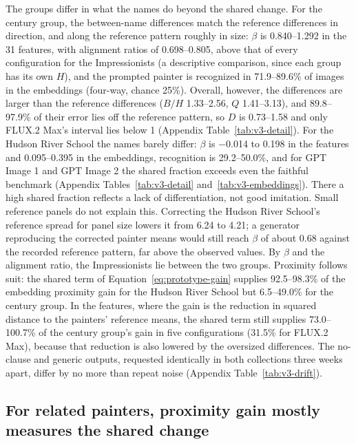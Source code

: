 \documentclass[10pt]{article}
\begin{document}
The groups differ in what the names do beyond the shared change. For the century group, the
between-name differences match the reference differences in direction, and along the reference
pattern roughly in size: $\beta$ is 0.840--1.292 in the 31 features, with alignment ratios of
0.698--0.805, above that of every configuration for the Impressionists (a descriptive comparison,
since each group has its own $H$), and the prompted painter is recognized in 71.9--89.6\% of images
in the embeddings (four-way, chance 25\%). Overall, however, the differences are larger than the
reference differences ($B/H$ 1.33--2.56, $Q$ 1.41--3.13), and 89.8--97.9\% of their error lies off
the reference pattern, so $D$ is 0.73--1.58 and only FLUX.2 Max's interval lies below 1 (Appendix
Table~\ref{tab:v3-detail}). For the Hudson River School the names barely differ: $\beta$ is
$-$0.014 to 0.198 in the features and 0.095--0.395 in the embeddings, recognition is 29.2--50.0\%,
and for GPT Image 1 and GPT Image 2 the shared fraction exceeds even the faithful benchmark
(Appendix Tables~\ref{tab:v3-detail} and~\ref{tab:v3-embeddings}). There a high shared fraction
reflects a lack of differentiation, not good imitation. Small reference panels do not explain this.
Correcting the Hudson River School's reference spread for panel size lowers it from 6.24 to 4.21; a
generator reproducing the corrected painter means would still reach $\beta$ of about 0.68 against
the recorded reference pattern, far above the observed values. By $\beta$ and the alignment ratio,
the Impressionists lie between the two groups. Proximity follows suit: the shared term of
Equation~\ref{eq:prototype-gain} supplies 92.5--98.3\% of the embedding proximity gain for the
Hudson River School but 6.5--49.0\% for the century group. In the features, where the gain is the
reduction in squared distance to the painters' reference means, the shared term still supplies
73.0--100.7\% of the century group's gain in five configurations (31.5\% for FLUX.2 Max), because
that reduction is also lowered by the oversized differences. The no-clause and generic outputs,
requested identically in both collections three weeks apart, differ by no more than repeat noise
(Appendix Table~\ref{tab:v3-drift}).

\subsection{For related painters, proximity gain mostly measures the shared change}\label{sec:learned}
\end{document}
